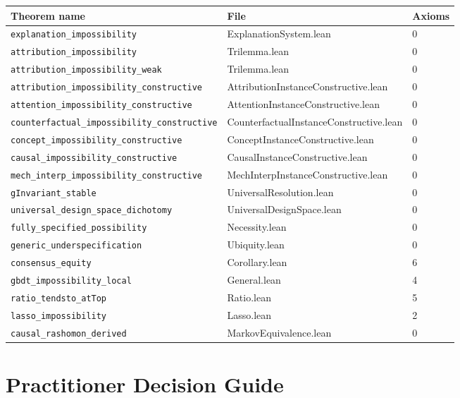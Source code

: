 \documentclass[11pt]{article}
\begin{document}
\begin{longtable}{lll}
\toprule
Theorem name & File & Axioms \\
\midrule
\texttt{explanation\_impossibility} & ExplanationSystem.lean & 0 \\
\texttt{attribution\_impossibility} & Trilemma.lean & 0 \\
\texttt{attribution\_impossibility\_weak} & Trilemma.lean & 0 \\
\texttt{attribution\_impossibility\_constructive} & AttributionInstanceConstructive.lean & 0 \\
\texttt{attention\_impossibility\_constructive} & AttentionInstanceConstructive.lean & 0 \\
\texttt{counterfactual\_impossibility\_constructive} & CounterfactualInstanceConstructive.lean & 0 \\
\texttt{concept\_impossibility\_constructive} & ConceptInstanceConstructive.lean & 0 \\
\texttt{causal\_impossibility\_constructive} & CausalInstanceConstructive.lean & 0 \\
\texttt{mech\_interp\_impossibility\_constructive} & MechInterpInstanceConstructive.lean & 0 \\
\texttt{gInvariant\_stable} & UniversalResolution.lean & 0 \\
\texttt{universal\_design\_space\_dichotomy} & UniversalDesignSpace.lean & 0 \\
\texttt{fully\_specified\_possibility} & Necessity.lean & 0 \\
\texttt{generic\_underspecification} & Ubiquity.lean & 0 \\
\texttt{consensus\_equity} & Corollary.lean & 6 \\
\texttt{gbdt\_impossibility\_local} & General.lean & 4 \\
\texttt{ratio\_tendsto\_atTop} & Ratio.lean & 5 \\
\texttt{lasso\_impossibility} & Lasso.lean & 2 \\
\texttt{causal\_rashomon\_derived} & MarkovEquivalence.lean & 0 \\
\bottomrule
\end{longtable}


\section{Practitioner Decision Guide}
\label{sec:si-practitioner}
\end{document}
